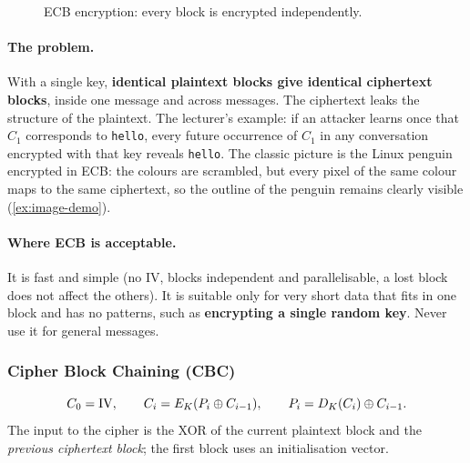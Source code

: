\begin{figure}[H]
\centering
{}
\caption{ECB encryption: every block is encrypted independently.}
\label{fig:ecb}
\end{figure}

\paragraph{The problem.} With a single key, \textbf{identical plaintext blocks give identical ciphertext blocks}, inside one message and across messages. The ciphertext leaks the structure of the plaintext. The lecturer's example: if an attacker learns once that $C_1$ corresponds to \texttt{hello}, every future occurrence of $C_1$ in any conversation encrypted with that key reveals \texttt{hello}. The classic picture is the Linux penguin encrypted in ECB: the colours are scrambled, but every pixel of the same colour maps to the same ciphertext, so the outline of the penguin remains clearly visible (\cref{ex:image-demo}).

\paragraph{Where ECB is acceptable.} It is fast and simple (no IV, blocks independent and parallelisable, a lost block does not affect the others). It is suitable only for very short data that fits in one block and has no patterns, such as \textbf{encrypting a single random key}. Never use it for general messages.

\subsubsection{Cipher Block Chaining (CBC)}

\[
    C_0 = \mathrm{IV}, \qquad C_i = E_K(P_i \oplus C_{i-1}), \qquad P_i = D_K(C_i) \oplus C_{i-1}.
\]
The input to the cipher is the XOR of the current plaintext block and the \emph{previous ciphertext block}; the first block uses an initialisation vector.

